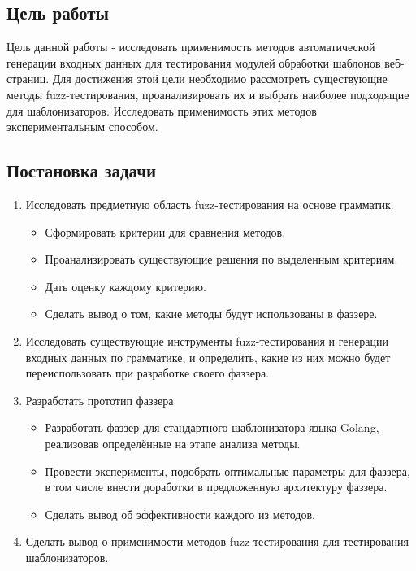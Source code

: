 \documentclass[a4paper]{article}
\begin{document}
\subsection{Цель работы}

Цель данной работы - исследовать применимость методов автоматической генерации входных данных для тестирования модулей обработки шаблонов веб-страниц. Для достижения этой цели необходимо рассмотреть существующие методы fuzz-тестирования, проанализировать их и выбрать наиболее подходящие для шаблонизаторов. Исследовать применимость этих методов экспериментальным способом.



\subsection{Постановка задачи}
\begin{enumerate}
    \item Исследовать предметную область fuzz-тестирования на основе грамматик.
        \begin{itemize}
        \item Сформировать критерии для сравнения методов.
        \item Проанализировать существующие решения по выделенным критериям.
        \item Дать оценку каждому критерию.
        \item Сделать вывод о том, какие методы будут использованы в фаззере.
        \end{itemize}
    \item Исследовать существующие инструменты fuzz-тестирования и генерации входных данных по грамматике, и определить, какие из них можно будет переиспользовать при разработке своего фаззера.
    \item Разработать прототип фаззера
        \begin{itemize}
        \item Разработать фаззер для стандартного шаблонизатора языка Golang, реализовав определённые на этапе анализа методы.
        \item Провести эксперименты, подобрать оптимальные параметры для фаззера, в том числе внести доработки в предложенную архитектуру фаззера. 
        \item Сделать вывод об эффективности каждого из методов.
        \end{itemize} 
    \item Сделать вывод о применимости методов fuzz-тестирования для тестирования шаблонизаторов.
\end{enumerate}
\end{document}
